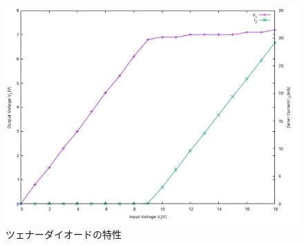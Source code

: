 \begin{itemize}
\begin{table}[h]
{}
\end{table}
\begin{figure}[h]
\centering
\includegraphics[scale=0.65]{./data/zener/zener-graph.pdf}
\caption{ツェナーダイオードの特性}
\label{fig:zenerg}
\end{figure}
\end{itemize}

\clearpage
